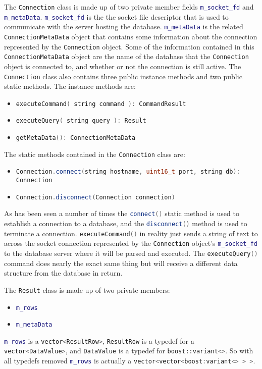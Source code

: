 \documentclass[letterpaper, 12pt]{article}
\newcommand{\inlinecode}[1]{\colorbox{codegrey}{\lstinline[language=C++]{#1}}}
\begin{document}
  \par\vspace{\baselineskip}
  The \inlinecode{Connection} class is made up of two private
  member fields \inlinecode{m_socket_fd} and
  \inlinecode{m_metaData}.
  \inlinecode{m_socket_fd} is the the socket file descriptor that is
  used to communicate with the server hosting the database.
  \inlinecode{m_metaData} is the related
  \inlinecode{ConnectionMetaData} object that contains some
  information about the connection represented by the
  \inlinecode{Connection} object. Some of the information contained
  in this \inlinecode{ConnectionMetaData} object are
  the name of the database that the \inlinecode{Connection} object
  is connected to, and whether or not the connection is still active. The
  \inlinecode{Connection} class also contains three public
  instance methods and two public static methods. The instance methods are:
  \begin{itemize}
    \item \inlinecode{executeCommand( string command ): CommandResult}
    \item \inlinecode{executeQuery( string query ): Result}
    \item \inlinecode{getMetaData(): ConnectionMetaData}
  \end{itemize}
  The static methods contained in the \inlinecode{Connection} class
  are:
  \begin{itemize}
  	\item \inlinecode{Connection.connect(string hostname, uint16_t port, string db): Connection}
  	\item \inlinecode{Connection.disconnect(Connection connection)}
  \end{itemize}
  As has been seen a number of times the \inlinecode{connect()}
  static method is used  to establish a connection to a database, and the
  \inlinecode{disconnect()} method is used to terminate a connection.
  \inlinecode{executeCommand()} in reality just sends a string of
  text to across the socket connection represented by the
  \inlinecode{Connection} object's
  \inlinecode{m_socket_fd} to the database server where it will be
  parsed and executed. The \inlinecode{executeQuery()} command
  does nearly the exact same thing but will receive a different data structure from the
  database in return.
  \par\vspace{\baselineskip}

  The \inlinecode{Result} class is made up of two private members:
  \begin{itemize}
    \item \inlinecode{m_rows}
    \item \inlinecode{m_metaData}
  \end{itemize}
  \inlinecode{m_rows} is a \inlinecode{vector<ResultRow>}, \inlinecode{ResultRow} is a typedef for
  a  \\ \inlinecode{vector<DataValue>}, and \inlinecode{DataValue} is a typedef for \inlinecode{boost::variant<>}.
  So with all typedefs removed \inlinecode{m_rows} is actually a \inlinecode{vector<vector<boost:variant<> > >}.
\end{document}
